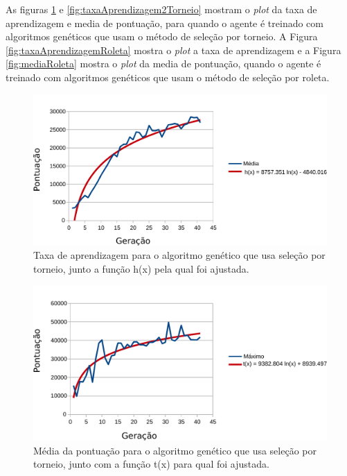 \documentclass[10pt,a4paper]{article}
\begin{document}
As figuras \ref{fig:taxaAprendizagemTorneio} e \ref{fig:taxaAprendizagem2Torneio} mostram o \emph{plot} da taxa de aprendizagem e media de pontuação, para quando o agente é treinado com algoritmos genéticos que usam o método de seleção por torneio. A Figura \ref{fig:taxaAprendizagemRoleta}  mostra o \emph{plot} a taxa de aprendizagem e a Figura \ref{fig:mediaRoleta}  mostra o \emph{plot} da media de pontuação, quando o agente é treinado com algoritmos genéticos que usam o método de seleção por roleta. 
\begin{figure}[H]
  \center
  \includegraphics[scale=0.6]{imgs/plotTorneio.pdf}            
  \caption{Taxa de aprendizagem para o algoritmo genético que usa seleção por torneio, junto a função h(x) pela
qual foi ajustada.}
  \label{fig:taxaAprendizagemTorneio}
\end{figure}
\begin{figure}[H]
  \center
  \includegraphics[scale=0.6]{imgs/plotTorneio2.pdf}
  \caption{Média da pontuação para o algoritmo genético que usa seleção por torneio, junto com a função t(x)
para qual foi ajustada.}
  \label{fig:mediaTorneio}
\end{figure}
\end{document}
